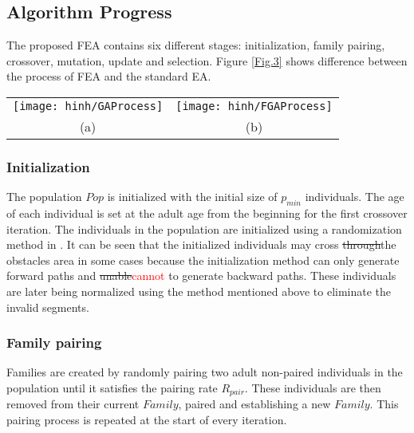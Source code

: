 \documentclass[final]{elsarticle}
\begin{document}
\subsection{Algorithm Progress}

The proposed FEA contains six different stages: initialization, family pairing, crossover, mutation, update and selection. Figure \ref{Fig.3} shows difference between the process of FEA and the standard EA.
\begin{figure*}[h]
	\begin{tabular}{cc}
		\texttt{[image: hinh/GAProcess]}&\texttt{[image: hinh/FGAProcess]}\\
		(a)  &(b) \\
	\end{tabular}
	\centering
	\caption{The algorithm process of EA (a) and FEA (b)
	}
	\label{Fig.3}       %
\end{figure*}

\subsubsection{Initialization}

The population $Pop$ is initialized with the initial size of $p_{min}$ individuals. The age of each individual is set at the adult age from the beginning for the first crossover iteration. The individuals in the population are initialized using a randomization method in \cite{binh2019efficient}. It can be seen that the initialized individuals may cross \sout{through}the obstacles area in some cases because the initialization method can only generate forward paths and \sout{unable}\textcolor{red}{cannot} to generate backward paths. These individuals are later being normalized using the method mentioned above to eliminate the invalid segments.

\subsubsection{Family pairing}

Families are created by randomly pairing two adult non-paired individuals in the population until it satisfies the pairing rate $R_{pair}$. These individuals are then removed from their current $ Family $, paired and establishing a new $Family$. This pairing process is repeated at the start of every iteration.
\end{document}
